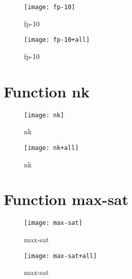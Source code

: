 \begin{figure}[h]
\begin{center}
\texttt{[image: fp-10]}
\caption{fp-10}
\end{center}
\end{figure}

\begin{figure}[h]
\begin{center}
\texttt{[image: fp-10+all]}
\caption{fp-10}
\end{center}
\end{figure}

\newpage

\section{Function nk}

\begin{center}

\end{center}

\begin{figure}[h]
\begin{center}
\texttt{[image: nk]}
\caption{nk}
\end{center}
\end{figure}

\begin{figure}[h]
\begin{center}
\texttt{[image: nk+all]}
\caption{nk}
\end{center}
\end{figure}

\newpage

\section{Function max-sat}

\begin{center}

\end{center}

\begin{figure}[h]
\begin{center}
\texttt{[image: max-sat]}
\caption{max-sat}
\end{center}
\end{figure}

\begin{figure}[h]
\begin{center}
\texttt{[image: max-sat+all]}
\caption{max-sat}
\end{center}
\end{figure}

